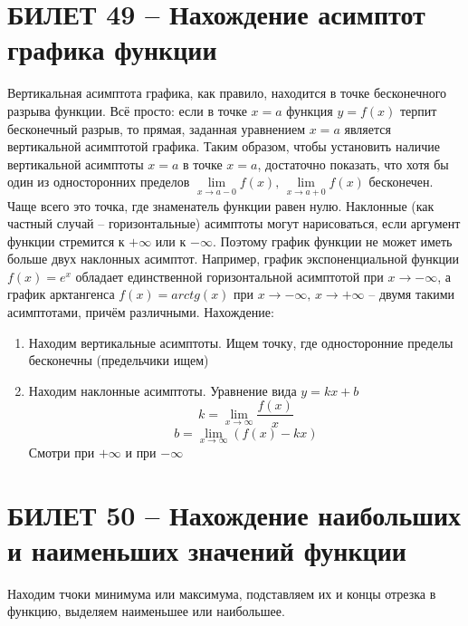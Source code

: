 \documentclass{article}
\begin{document}
\section{БИЛЕТ 49 -- Нахождение асимптот графика функции}
Вертикальная асимптота графика, как правило, находится в точке бесконечного разрыва функции. Всё просто: если в точке $x=a$ функция $y=f(x)$ терпит бесконечный разрыв,  то прямая, заданная уравнением $x=a$ является вертикальной асимптотой графика.
\newline
Таким образом, чтобы установить наличие вертикальной асимптоты $x=a$ в точке $x=a$, достаточно показать, что хотя бы один из односторонних пределов $\lim\limits_{x\to a-0}f(x),\,\lim\limits_{x\to a+0} f(x)$ бесконечен. Чаще всего это точка, где знаменатель функции равен нулю.
\newline
\newline
Наклонные (как частный случай – горизонтальные) асимптоты могут нарисоваться, если аргумент функции стремится к $+\infty$ или к $-\infty$. Поэтому график функции не может иметь больше двух наклонных асимптот. Например, график экспоненциальной функции $f(x)=e^x$ обладает единственной горизонтальной асимптотой при $x\to-\infty$, а график арктангенса $f(x)=arctg(x)$ при $x\to-\infty,\,x\to+\infty$ – двумя такими асимптотами, причём различными.
\newline
Нахождение:
\begin{enumerate}
    \item Находим вертикальные асимптоты. Ищем точку, где односторонние пределы бесконечны (предельчики ищем)
    \item Находим наклонные асимптоты. Уравнение вида $y=kx+b$
    $$ k=\lim_{x\to\infty}\frac{f(x)}{x} $$
    $$ b= \lim_{x\to\infty}(f(x)-kx)$$
    Смотри при $+\infty$ и при $-\infty$
\end{enumerate}
\newpage
\section{БИЛЕТ 50 -- Нахождение наибольших и наименьших значений функции}
Находим тчоки минимума или максимума, подставляем их и концы отрезка в функцию, выделяем наименьшее или наибольшее.
\newpage
\end{document}
